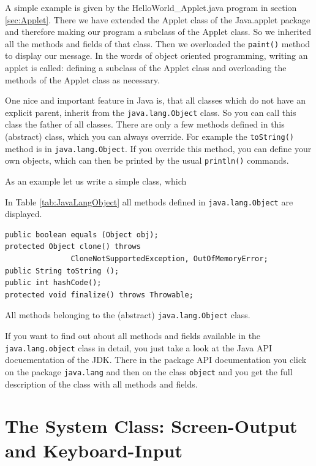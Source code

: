 A simple example is given by the
HelloWorld\_Applet.java program in section \ref{sec:Applet}.
There we have extended the Applet class of the Java.applet package
and therefore making our program a subclass of the Applet class.
So we inherited all the methods and fields of that class. Then we
overloaded the \verb|paint()| method to display our message. 
In the words of object oriented programming, writing an applet is
called: defining a subclass of the Applet class and overloading
the methods of the Applet class as necessary.

One nice and important feature in Java is, that all classes which
do not have an explicit parent, inherit from the \verb|java.lang.Object| 
class. So you can call this class the father of all classes.
There are only a few methods defined in this (abstract) class,
which you can always override. For example the \verb|toString()| 
method is in \verb|java.lang.Object|. If you override this method,
you can define your own objects, which can then be printed by
the usual \verb|println()| commands. 

As an example let us write a simple class, which 

In Table \ref{tab:JavaLangObject}
all methods defined in \verb|java.lang.Object| are displayed.
\begin{table}[htbp]
  \begin{center}
\begin{small}
\begin{verbatim}
public boolean equals (Object obj);
protected Object clone() throws 
               CloneNotSupportedException, OutOfMemoryError;
public String toString ();
public int hashCode(); 
protected void finalize() throws Throwable;
\end{verbatim}
\end{small}
    \caption{All methods belonging to the (abstract) 
               \texttt{java.lang.Object} class.}
    \label{tab:JavaLangObject}
  \end{center}
\end{table}

If you want to find out about all methods and fields available
in the \verb|java.lang.object| class in detail, you just take
a look at the Java API docuementation of the JDK. There in the
package API documentation  you
click on the package \verb|java.lang| and then on the class
\verb|object| and you get the full description of the class
with all methods and fields.


\section{The System Class: Screen-Output and Keyboard-Input}

